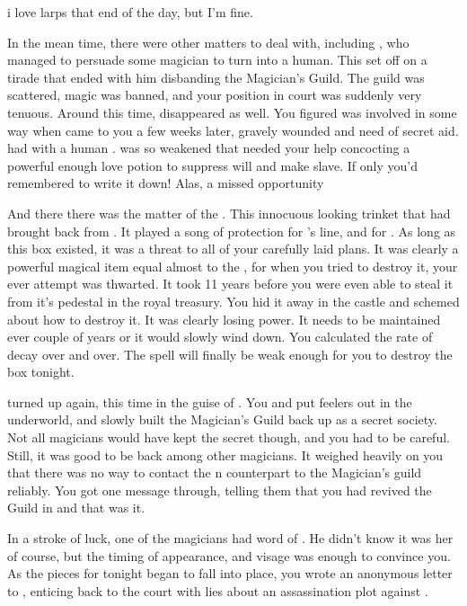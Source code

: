 i love larps that end of the day, but I'm fine.\documentclass[char]{NeptuneBall}
\begin{document}
In the mean time, there were other matters to deal with, including \cAriel{\Prince} \cAriel{}, who managed to persuade some magician to turn \cAriel{\them} into a human. This set \cKing{} off on a tirade that ended with him disbanding the Magician's Guild. The guild was scattered, magic was banned, and your position in court was suddenly very tenuous. Around this time, \cWitch{} disappeared as well. You figured \cWitch{\they} was involved in some way when \cWitch{\they} came to you a few weeks later, gravely wounded and need of secret aid. \cWitch{\They} had with \cWitch{\them} a human \cSlave{\Prince}. \cWitch{} was so weakened that \cWitch{\they} needed your help concocting a powerful enough love potion to suppress \cSlave{\their} will and make \cSlave{\them} \cWitch{\them} slave. If only you'd remembered to write it down! Alas, a missed opportunity

And there there was the matter of the \iMusicBox{\MYname}. This innocuous looking trinket that \cQueen{} had brought back from \cNixie{}. It played a song of protection for \cKing{}'s line, and for \pAtlantis{}. As long as this box existed, it was a threat to all of your carefully laid plans. It was clearly a powerful magical item equal almost to the \iTrident{\MYname}, for when you tried to destroy it, your ever attempt was thwarted. It took 11 years before you were even able to steal it from it's pedestal in the royal treasury. You hid it away in the castle and schemed about how to destroy it. It was clearly losing power. It needs to be maintained ever couple of years or it would slowly wind down. You calculated the rate of decay over and over. The spell will finally be weak enough for you to destroy the box tonight.

\cWitch{} turned up again, this time in the guise of \cWitch{\MYname}. You and \cWitch{\they} put feelers out in the underworld, and slowly built the Magician's Guild back up as a secret society. Not all magicians would have kept the secret though, and you had to be careful. Still, it was good to be back among other magicians. It weighed heavily on you that there was no way to contact the \pPacifica{}n counterpart to the Magician's guild reliably. You got one message through, telling them that you had revived the Guild in \pAtlantis{} and that was it.

In a stroke of luck, one of the magicians had word of \cQueen{}. He didn't know it was her of course, but the timing of \cQueen{\them} appearance, and \cQueen{\them} visage was enough to convince you. As the pieces for tonight began to fall into place, you wrote an anonymous letter to \cQueen{}, enticing \cQueen{\them} back to the court with lies about an assassination plot against \cKing{}.
\end{document}
